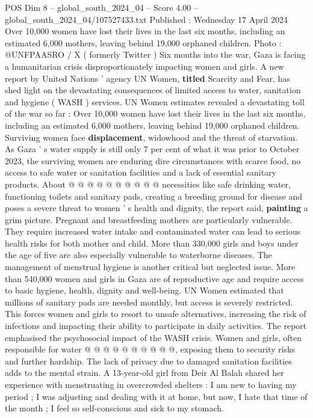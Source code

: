 \begin{textsample}{POS Dim 8 – global\_south\_2024\_04 – Score 4.00 – global\_south\_2024\_04/107527433.txt}  \label{ex:f8_pos_412}
Published : Wednesday 17 April 2024 Over 10,000 women have lost their lives in the last six months, including an estimated 6,000 mothers, leaving behind 19,000 orphaned children.
Photo : @UNFPAASRO / X ( formerly Twitter ) Six months into the war, Gaza is facing a humanitarian crisis disproportionately impacting women and girls.
A new report by United Nations ' agency UN Women, \textbf{titled} Scarcity and Fear, has shed light on the devastating consequences of limited access to water, sanitation and hygiene ( WASH ) services.
UN Women estimates revealed a devastating toll of the war so far : Over 10,000 women have lost their lives in the last six months, including an estimated 6,000 mothers, leaving behind 19,000 orphaned children.
Surviving women face \textbf{displacement}, widowhood and the threat of starvation.
As Gaza ' s water supply is still only 7 per cent of what it was prior to October 2023, the surviving women are enduring dire circumstances with scarce food, no access to safe water or sanitation facilities and a lack of essential sanitary products.
About @ @ @ @ @ @ @ @ @ @ necessities like safe drinking water, functioning toilets and sanitary pads, creating a breeding ground for disease and poses a severe threat to women ' s health and dignity, the report said, \textbf{painting} a grim picture.
Pregnant and breastfeeding mothers are particularly vulnerable.
They require increased water intake and contaminated water can lead to serious health risks for both mother and child.
More than 330,000 girls and boys under the age of five are also especially vulnerable to waterborne diseases.
The management of menstrual hygiene is another critical but neglected issue.
More than 540,000 women and girls in Gaza are of reproductive age and require access to basic hygiene, health, dignity and well-being.
UN Women estimated that millions of sanitary pads are needed monthly, but access is severely restricted.
This forces women and girls to resort to unsafe alternatives, increasing the risk of infections and impacting their ability to participate in daily activities.
The report emphasised the psychosocial impact of the WASH crisis.
Women and girls, often responsible for water @ @ @ @ @ @ @ @ @ @, exposing them to security risks and further hardship.
The lack of privacy due to damaged sanitation facilities adds to the mental strain.
A 13-year-old girl from Deir Al Balah shared her experience with menstruating in overcrowded shelters : I am new to having my period ; I was adjusting and dealing with it at home, but now, I hate that time of the month ; I feel so self-conscious and sick to my stomach.

\end{textsample}

